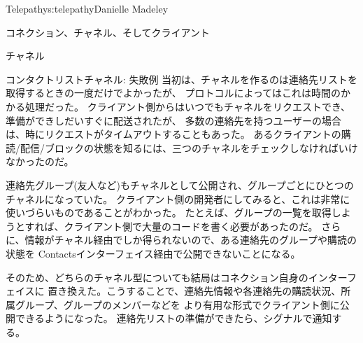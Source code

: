 \begin{aosachapter}{Telepathy}{s:telepathy}{Danielle Madeley}
\begin{aosasect1}{コネクション、チャネル、そしてクライアント}
\begin{aosasect2}{チャネル}
\begin{aosabox}{コンタクトリストチャネル: 失敗例}
当初は、チャネルを作るのは連絡先リストを取得するときの一度だけでよかったが、
プロトコルによってはこれは時間のかかる処理だった。
クライアント側からはいつでもチャネルをリクエストでき、準備ができしだいすぐに配送されたが、
多数の連絡先を持つユーザーの場合は、時にリクエストがタイムアウトすることもあった。
あるクライアントの購読/配信/ブロックの状態を知るには、三つのチャネルをチェックしなければいけなかったのだ。

連絡先グループ(友人など)もチャネルとして公開され、グループごとにひとつのチャネルになっていた。
クライアント側の開発者にしてみると、これは非常に使いづらいものであることがわかった。
たとえば、グループの一覧を取得しようとすれば、クライアント側で大量のコードを書く必要があったのだ。
さらに、情報がチャネル経由でしか得られないので、ある連絡先のグループや購読の状態を
Contactsインターフェイス経由で公開できないことになる。

そのため、どちらのチャネル型についても結局はコネクション自身のインターフェイスに
置き換えた。こうすることで、連絡先情報や各連絡先の購読状況、所属グループ、グループのメンバーなどを
より有用な形式でクライアント側に公開できるようになった。
連絡先リストの準備ができたら、シグナルで通知する。

\end{aosabox}

\end{aosasect2}


\end{aosasect1}
\end{aosachapter}
